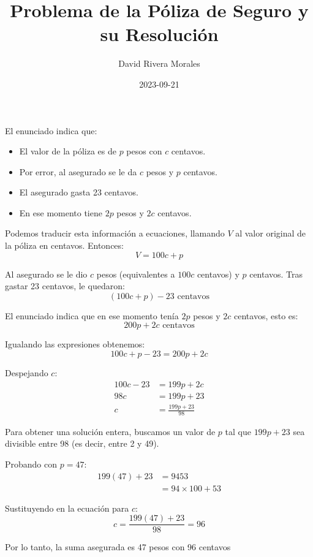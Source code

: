 \documentclass{article}
\begin{document}
\title{Problema de la Póliza de Seguro y su Resolución}
\author{David Rivera Morales}
\date{2023-09-21}

\maketitle

El enunciado indica que:
\begin{itemize}
\item El valor de la póliza es de $p$ pesos con $c$ centavos.
\item Por error, al asegurado se le da $c$ pesos y $p$ centavos.
\item El asegurado gasta 23 centavos.
\item En ese momento tiene $2p$ pesos y $2c$ centavos.
\end{itemize}

Podemos traducir esta información a ecuaciones, llamando $V$ al valor original de la póliza en centavos. Entonces:
\begin{equation}
V = 100c + p
\end{equation}

Al asegurado se le dio $c$ pesos (equivalentes a $100c$ centavos) y $p$ centavos. Tras gastar 23 centavos, le quedaron:
\begin{equation}
(100c + p) - 23 \text{ centavos}
\end{equation}

El enunciado indica que en ese momento tenía $2p$ pesos y $2c$ centavos, esto es:
\begin{equation}
200p + 2c \text{ centavos}
\end{equation}

Igualando las expresiones obtenemos:
\begin{equation}
100c + p - 23 = 200p + 2c
\end{equation}

Despejando $c$:
\begin{align}
100c - 23 &= 199p + 2c \\
98c &= 199p + 23 \\
c &= \frac{199p + 23}{98}
\end{align}

Para obtener una solución entera, buscamos un valor de $p$ tal que $199p + 23$ sea divisible entre 98 (es decir, entre 2 y 49).

Probando con $p = 47$:
\begin{align*}
199(47) + 23 &= 9453 \\
&= 94 \times 100 + 53
\end{align*}

Sustituyendo en la ecuación para $c$:
\begin{equation}
c = \frac{199(47) + 23}{98} = 96
\end{equation}

Por lo tanto, la suma asegurada es 47 pesos con 96 centavos
\end{document}
